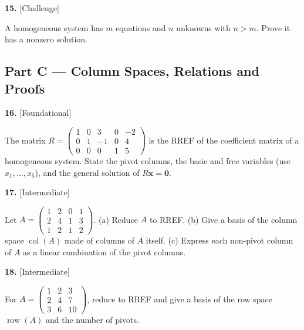 \documentclass[11pt]{article}
\begin{document}
\begin{minipage}{\linewidth}\textbf{15.} \hfill{\scriptsize\color{ink}[Challenge]}\par\nopagebreak A homogeneous system has $m$ equations and $n$ unknowns with $n>m$. Prove it has a nonzero solution.
\vspace{3.4cm}\end{minipage}\par\vspace{4pt}
\subsection*{\normalsize\color{ink} Part C --- Column Spaces, Relations and Proofs}
\begin{minipage}{\linewidth}\textbf{16.} \hfill{\scriptsize\color{ink}[Foundational]}\par\nopagebreak The matrix $R=\begin{pmatrix}1 & 0 & 3 & 0 & -2 \\ 0 & 1 & -1 & 0 & 4 \\ 0 & 0 & 0 & 1 & 5\end{pmatrix}$ is the RREF of the coefficient matrix of a homogeneous system. State the pivot columns, the basic and free variables (use $x_1,\dots,x_5$), and the general solution of $R\mathbf x=\mathbf 0$.
\vspace{3.8cm}\end{minipage}\par\vspace{4pt}
\begin{minipage}{\linewidth}\textbf{17.} \hfill{\scriptsize\color{ink}[Intermediate]}\par\nopagebreak Let $A=\begin{pmatrix}1 & 2 & 0 & 1 \\ 2 & 4 & 1 & 3 \\ 1 & 2 & 1 & 2\end{pmatrix}$. (a) Reduce $A$ to RREF. (b) Give a basis of the column space $\operatorname{col}(A)$ made of columns of $A$ itself. (c) Express each non-pivot column of $A$ as a linear combination of the pivot columns.
\vspace{4.9cm}\end{minipage}\par\vspace{4pt}
\begin{minipage}{\linewidth}\textbf{18.} \hfill{\scriptsize\color{ink}[Intermediate]}\par\nopagebreak For $A=\begin{pmatrix}1 & 2 & 3 \\ 2 & 4 & 7 \\ 3 & 6 & 10\end{pmatrix}$, reduce to RREF and give a basis of the row space $\operatorname{row}(A)$ and the number of pivots.
\vspace{4.1cm}\end{minipage}\par\vspace{4pt}
\end{document}
